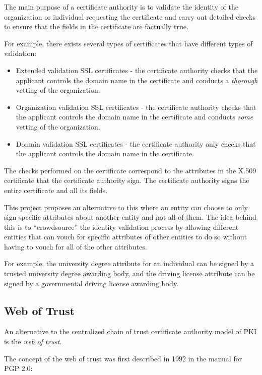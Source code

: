 \documentclass[12pt]{report}
\begin{document}
	The main purpose of a certificate authority is to validate the identity of the organization or individual requesting the certificate and carry out detailed checks to ensure that the fields in the certificate are factually true.\cite{27}

	For example, there exists several types of certificates that have different types of validation:\cite{29}
	\begin{itemize}
		\item Extended validation SSL certificates - the certificate authority checks that the applicant controls the domain name in the certificate and conducts a \textit{thorough} vetting of the organization.
		\item Organization validation SSL certificates - the certificate authority checks that the applicant controls the domain name in the certificate and conducts \textit{some} vetting of the organization.
		\item Domain validation SSL certificates - the certificate authority only checks that the applicant controls the domain name in the certificate.
	\end{itemize}
	
	The checks performed on the certificate correspond to the attributes in the X.509 certificate that the certificate authority sign. The certificate authority signs the entire certificate and all its fields.
	
	This project proposes an alternative to this where an entity can choose to only sign specific attributes about another entity and not all of them. The idea behind this is to ``crowdsource'' the identity validation process by allowing different entities that can vouch for specific attributes of other entities to do so without having to vouch for all of the other attributes.
	
	For example, the university degree attribute for an individual can be signed by a trusted university degree awarding body, and the driving license attribute can be signed by a governmental driving license awarding body.
	
	\subsection{Web of Trust}
	An alternative to the centralized chain of trust certificate authority model of PKI is the \textit{web of trust}.
	
	The concept of the web of trust was first described in 1992 in the manual for PGP 2.0:
	
\end{document}
